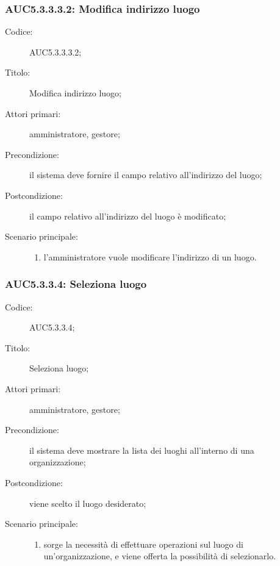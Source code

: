 \documentclass[../../../analisi-dei-requisiti.tex]{subfiles}
\begin{document}
\subsubsection{AUC5.3.3.3.2: Modifica indirizzo luogo}%
\label{subs:AUC5.3.3.3.2}
\begin{description}
  \item[Codice:] AUC5.3.3.3.2;
  \item[Titolo:] Modifica indirizzo luogo;
  \item[Attori primari:] amministratore, gestore;
  \item[Precondizione:] il sistema deve fornire il campo relativo all'indirizzo del luogo;
  \item[Postcondizione:] il campo relativo all'indirizzo del luogo è modificato;
  \item[Scenario principale:]
  \begin{enumerate}
    \item l'amministratore vuole modificare l'indirizzo di un luogo.
  \end{enumerate}
\end{description}

\subsubsection{AUC5.3.3.4: Seleziona luogo}%
\label{subs:AUC5.3.3.4}
\begin{description}
  \item[Codice:] AUC5.3.3.4;
  \item[Titolo:] Seleziona luogo;
  \item[Attori primari:] amministratore, gestore;
  \item[Precondizione:] il sistema deve mostrare la lista dei luoghi all'interno di una organizzazione;
  \item[Postcondizione:] viene scelto il luogo desiderato;
  \item[Scenario principale:]
  \begin{enumerate}
    \item sorge la necessità di effettuare operazioni sul luogo di un'organizzazione, e viene offerta la possibilità di selezionarlo.
  \end{enumerate}
\end{description}

\end{document}
